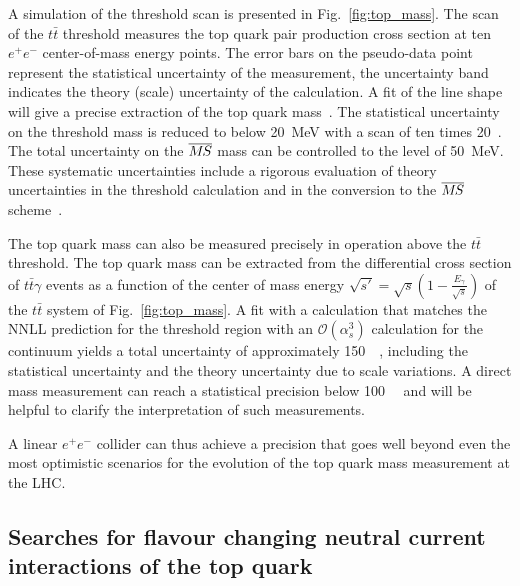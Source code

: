 A simulation of the threshold scan is presented in
Fig.~\ref{fig:top_mass}. The scan of the $t\bar t$ threshold measures the
top quark pair production cross section at ten $e^+e^-$ center-of-mass energy points. 
The error bars on the pseudo-data point represent the statistical uncertainty of
the measurement, the uncertainty band indicates the theory (scale) uncertainty 
of the calculation. A fit of the line shape will give
a precise extraction of the top quark mass~\cite{Martinez:2002st,Horiguchi:2013wra,Seidel:2013sqa}.
The statistical uncertainty on the threshold mass is reduced to 
below 20~MeV with a scan of ten times 20~\ifb. The total uncertainty 
on the $\msb$ mass can be controlled to the level
of 50~MeV. These systematic uncertainties
include a rigorous evaluation of theory uncertainties in the 
threshold calculation and in the conversion
to the $\msb$ scheme~\cite{Simon:2016pwp}.

The top quark mass can also be measured precisely in operation above the $t\bar t$
threshold. The top quark mass can be extracted from the differential cross section of $t\bar t \gamma$ 
events as a function of the center of mass energy $\sqrt{s'} = \sqrt{s} ( 1 - \frac{E_{\gamma}}{\sqrt{s}})$ 
of the $t \bar t$ system of Fig.~\ref{fig:top_mass}. A fit with a calculation that matches the 
NNLL prediction for the threshold region with an $\mathcal{O} (\alpha_{s}^3)$ calculation for 
the continuum yields a total uncertainty of approximately 150~\MeV{}~\cite{Abramowicz:2018rjq}, 
including the statistical uncertainty and the theory uncertainty due to scale variations. A direct mass 
measurement can reach a statistical precision below 100~\MeV{}~\cite{Seidel:2013sqa} and will be helpful 
to clarify the interpretation of such measurements.

A linear $e^+e^-$ collider
can thus achieve a precision that goes well beyond
even the most optimistic scenarios for the evolution 
of the top quark mass measurement at the LHC.

\subsection{Searches for flavour changing neutral current interactions of the top quark}
\label{subsec:top:fcnc}

